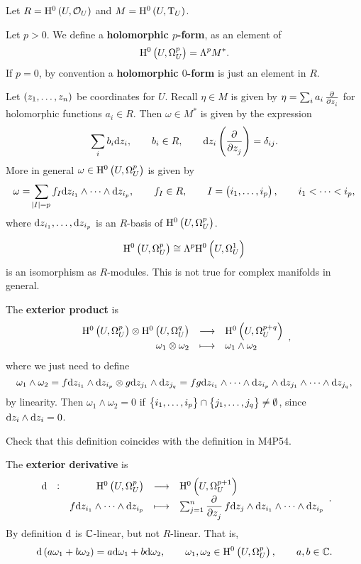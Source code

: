 Let $ R = \H^0\br{U, \OOO_U} $ and $ M = \H^0\br{U, \T_U} $.

\begin{definition}
Let $ p > 0 $. We define a \textbf{holomorphic $ p $-form}, as an element of
$$ \H^0\br{U, \Omega_U^p} = \Lambda^pM^*. $$
If $ p = 0 $, by convention a \textbf{holomorphic $ 0 $-form} is just an element in $ R $.
\end{definition}

Let $ \br{z_1, \dots, z_n} $ be coordinates for $ U $. Recall $ \eta \in M $ is given by $ \eta = \sum_i a_i\tpd{}{z_i} $ for holomorphic functions $ a_i \in R $. Then $ \omega \in M^* $ is given by the expression
$$ \sum_i b_i \d z_i, \qquad b_i \in R, \qquad \d z_i\br{\dpd{}{z_j}} = \delta_{ij}. $$
More in general $ \omega \in \H^0\br{U, \Omega_U^p} $ is given by
$$ \omega = \sum_{\abs{I} = p} f_I \d z_{i_1} \wedge \dots \wedge \d z_{i_p}, \qquad f_I \in R, \qquad I = \br{i_1, \dots, i_p}, \qquad i_1 < \dots < i_p, $$
where $ \mathrm{d} z_{i_1}, \dots, \mathrm{d} z_{i_p} $ is an $ R $-basis of $ \H^0\br{U, \Omega_U^p} $.

\begin{example*}
$$ \H^0\br{U, \Omega_U^p} \cong \Lambda^p\H^0\br{U, \Omega_U^1} $$
is an isomorphism as $ R $-modules. This is not true for complex manifolds in general.
\end{example*}

The \textbf{exterior product} is
$$ \function{\H^0\br{U, \Omega_U^p} \otimes \H^0\br{U, \Omega_U^q}}{\H^0\br{U, \Omega_U^{p + q}}}{\omega_1 \otimes \omega_2}{\omega_1 \wedge \omega_2}, $$
where we just need to define
$$ \omega_1 \wedge \omega_2 = f \mathrm{d} z_{i_1} \wedge \mathrm{d} z_{i_p} \otimes g \mathrm{d} z_{j_1} \wedge \mathrm{d} z_{j_q} = fg \mathrm{d} z_{i_1} \wedge \dots \wedge \mathrm{d} z_{i_p} \wedge \mathrm{d} z_{j_1} \wedge \dots \wedge \mathrm{d} z_{j_q}, $$
by linearity. Then $ \omega_1 \wedge \omega_2 = 0 $ if $ \cbr{i_1, \dots, i_p} \cap \cbr{j_1, \dots, j_q} \ne \emptyset $, since $ \mathrm{d} z_i \wedge \mathrm{d} z_i = 0 $.

\begin{exercise*}
Check that this definition coincides with the definition in M4P54.
\end{exercise*}

The \textbf{exterior derivative} is
$$ \function[\d]{\H^0\br{U, \Omega_U^p}}{\H^0\br{U, \Omega_U^{p + 1}}}{f \d z_{i_1} \wedge \dots \wedge \d z_{i_p}}{\sum_{j = 1}^n \dpd{}{z_j}f \d z_j \wedge \d z_{i_1} \wedge \dots \wedge \d z_{i_p}}. $$
By definition $ \mathrm{d} $ is $ \mathbb{C} $-linear, but not $ R $-linear. That is,
$$ \d\br{a\omega_1 + b\omega_2} = a \d\omega_1 + b \d\omega_2, \qquad \omega_1, \omega_2 \in \H^0\br{U, \Omega_U^p}, \qquad a, b \in \CC. $$

